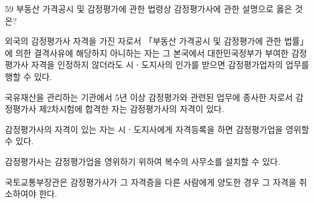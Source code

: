 \begin{question}{59}
부동산 가격공시 및 감정평가에 관한 법령상 감정평가사에 관한 설명으로 옳은 것은?
\begin{choices}
  \item 외국의 감정평가사 자격을 가진 자로서 「부동산 가격공시 및 감정평가에 관한 법률」에 의한 결격사유에 해당하지 아니하는 자는 그 본국에서 대한민국정부가 부여한 감정평가사 자격을 인정하지 않더라도 시ㆍ도지사의 인가를 받으면 감정평가업자의 업무를 행할 수 있다.
  \item 국유재산을 관리하는 기관에서 5년 이상 감정평가와 관련된 업무에 종사한 자로서 감정평가사 제2차시험에 합격한 자는 감정평가사의 자격이 있다.
  \item 감정평가사의 자격이 있는 자는 시ㆍ도지사에게 자격등록을 하면 감정평가업을 영위할 수 있다.
  \item 감정평가사는 감정평가업을 영위하기 위하여 복수의 사무소를 설치할 수 있다.
  \item 국토교통부장관은 감정평가사가 그 자격증을 다른 사람에게 양도한 경우 그 자격을 취소하여야 한다.
\end{choices}
\end{question}
